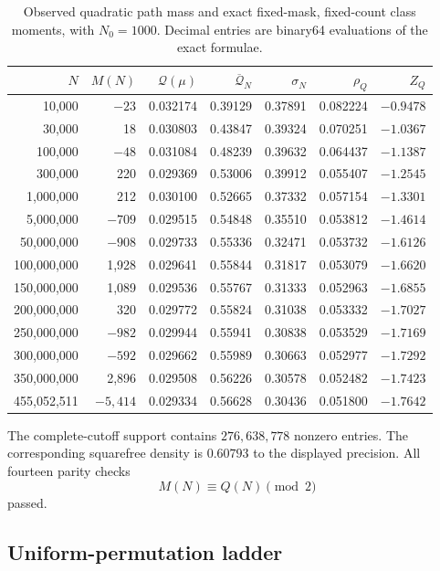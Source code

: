 \documentclass[11pt,reqno]{amsart}
\numberwithin{equation}{section}
\theoremstyle{plain}
\theoremstyle{definition}
\theoremstyle{remark}
\newcommand{\QF}{\mathcal Q}
\begin{document}
\begin{table}[htbp]
\centering
\scriptsize
\setlength{\tabcolsep}{3.2pt}
\caption{Observed quadratic path mass and exact fixed-mask, fixed-count class
moments, with \(N_0=1000\).  Decimal entries are binary64 evaluations of the
exact formulae.}
\label{tab:full-fixed-class-table}
\begin{tabular}{r r r r r r r}
\toprule
\(N\)&\(M(N)\)&\(\QF(\mu)\)&\(\overline{\QF}_N\)&\(\sigma_N\)&\(\rho_Q\)&\(Z_Q\)\\
\midrule
10,000&\(-23\)&0.032174&0.39129&0.37891&0.082224&\(-0.9478\)\\
30,000&18&0.030803&0.43847&0.39324&0.070251&\(-1.0367\)\\
100,000&\(-48\)&0.031084&0.48239&0.39632&0.064437&\(-1.1387\)\\
300,000&220&0.029369&0.53006&0.39912&0.055407&\(-1.2545\)\\
1,000,000&212&0.030100&0.52665&0.37332&0.057154&\(-1.3301\)\\
5,000,000&\(-709\)&0.029515&0.54848&0.35510&0.053812&\(-1.4614\)\\
50,000,000&\(-908\)&0.029733&0.55336&0.32471&0.053732&\(-1.6126\)\\
100,000,000&1,928&0.029641&0.55844&0.31817&0.053079&\(-1.6620\)\\
150,000,000&1,089&0.029536&0.55767&0.31333&0.052963&\(-1.6855\)\\
200,000,000&320&0.029772&0.55824&0.31038&0.053332&\(-1.7027\)\\
250,000,000&\(-982\)&0.029944&0.55941&0.30838&0.053529&\(-1.7169\)\\
300,000,000&\(-592\)&0.029662&0.55989&0.30663&0.052977&\(-1.7292\)\\
350,000,000&2,896&0.029508&0.56226&0.30578&0.052482&\(-1.7423\)\\
455,052,511&\(-5,414\)&0.029334&0.56628&0.30436&0.051800&\(-1.7642\)\\
\bottomrule
\end{tabular}
\end{table}

The complete-cutoff support contains \(276{,}638{,}778\) nonzero entries.
The corresponding squarefree density is \(0.60793\) to the displayed
precision.  All fourteen parity checks
\begin{equation}
M(N)\equiv Q(N)\pmod2
\label{eq:reported-parity-checks}
\end{equation}
passed.

\subsection{Uniform-permutation ladder}
\label{subsec:numerical-permutation-ladder}
\end{document}
